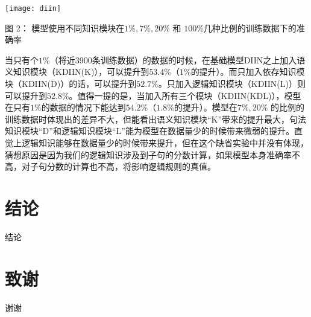 \documentclass[UTF8,11pt,a4paper,nofonts]{ctexart}
\begin{document}
\begin{table}[htbp!]
\centering
\texttt{[image: diin]}
\caption*{图 2： 模型使用不同知识模块在$1\%, 7\%, 20\%$ 和 $100\%$几种比例的训练数据下的准确率}%
\end{table}

当只有个$1\%$（将近3900条训练数据）的数据的时候，在基础模型DIIN之上加入语义知识模块（KDIIN(K)），可以提升到$53.4\%$（$1\%$的提升）。而只加入依存知识模块（KDIIN(D)）的话，可以提升到$52.7\%$。只加入逻辑知识模块（KDIIN(L)）则可以提升到$52.8\%$。值得一提的是，当加入所有三个模块（KDIIN(KDL)），模型在只有$1\%$的数据的情况下能达到$54.2\%$（$1.8\%$的提升）。模型在$7\%, 20\%$ 的比例的训练数据时体现出的差异不大，但能看出语义知识模块“K”带来的提升最大，句法知识模块“D”和逻辑知识模块“L”能为模型在数据量少的时候带来微弱的提升。直觉上逻辑知识能够在数据量少的时候带来提升，但在这个缺省实验中并没有体现，猜想原因是因为我们的逻辑知识涉及到子句的分数计算，如果模型本身准确率不高，对子句分数的计算也不高，将影响逻辑规则的真值。








\section{结论}

结论


\section{致谢}

谢谢

\newpage
{}

\end{document}
